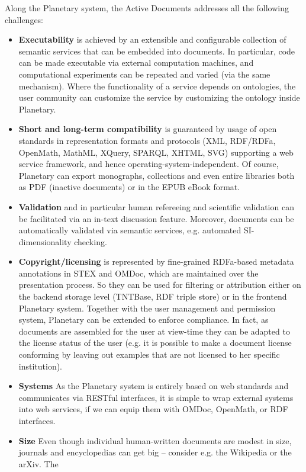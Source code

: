 Along the Planetary system, the Active Documents addresses all the following challenges:

\begin{itemize}
\item \textbf{Executability} is achieved by an extensible and configurable collection of
  semantic services that can be embedded into documents. In particular, code can be made
  executable via external computation machines, and computational experiments can be
  repeated and varied (via the same mechanism). Where the functionality of a service
  depends on ontologies, the user community can customize the service by customizing the
  ontology inside Planetary.
\item \textbf{Short and long-term compatibility} is guaranteed by usage of open standards
  in representation formats and protocols (XML, RDF/RDFa, OpenMath, MathML, XQuery,
  SPARQL, XHTML, SVG) supporting a web service framework, and hence
  operating-system-independent. Of course, Planetary can export monographs, collections
  and even entire libraries both as PDF (inactive documents) or in the EPUB eBook format.
\item \textbf{Validation} and in particular human refereeing and scientific validation can
  be facilitated via an in-text discussion feature. Moreover, documents can be
  automatically validated via semantic services, e.g. automated SI-dimensionality
  checking.
\item \textbf{Copyright/licensing} is represented by fine-grained RDFa-based metadata
  annotations in STEX and OMDoc, which are maintained over the presentation process. So
  they can be used for filtering or attribution either on the backend storage level
  (TNTBase, RDF triple store) or in the frontend Planetary system. Together with the user
  management and permission system, Planetary can be extended to enforce compliance. In
  fact, as documents are assembled for the user at view-time they can be adapted to the
  license status of the user (e.g. it is possible to make a document license conforming by
  leaving out examples that are not licensed to her specific institution).
\item \textbf{Systems} As the Planetary system is entirely based on web standards and
  communicates via RESTful interfaces, it is simple to wrap external systems into web
  services, if we can equip them with OMDoc, OpenMath, or RDF interfaces.
\item \textbf{Size} Even though individual human-written documents are modest in size,
  journals and encyclopedias can get big – consider e.g. the Wikipedia or the arXiv. The

\end{itemize}
